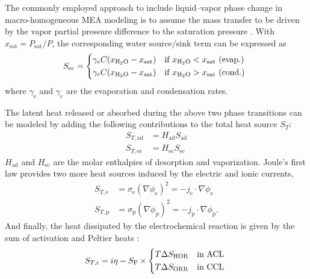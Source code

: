 \documentclass[fontsize=9pt,DIV=calc,a4paper,twocolumn]{scrartcl}
\begin{document}
The commonly employed approach to include liquid--vapor phase change in macro-homogeneous MEA modeling is to assume the mass transfer to be driven by the vapor partial pressure difference to the saturation pressure \cite{fritz:09}. With $x_\mathrm{sat}=P_\mathrm{sat}/P$, the corresponding water source/sink term can be expressed as
%
\begin{equation}
S_\mathrm{ec} =
\begin{dcases*}
\gamma_\mathrm{e}C(x_{\mathrm{H}_2\mathrm{O}}-x_\mathrm{sat}) & if $x_{\mathrm{H}_2\mathrm{O}} < x_\mathrm{sat}$ (evap.)\\
\gamma_\mathrm{c}C(x_{\mathrm{H}_2\mathrm{O}}-x_\mathrm{sat}) & if $x_{\mathrm{H}_2\mathrm{O}} > x_\mathrm{sat}$ (cond.)
\end{dcases*}
\end{equation}
%
where $\gamma_\mathrm{e}$ and $\gamma_\mathrm{c}$ are the evaporation and condensation rates.

The latent heat released or absorbed during the above two phase transitions can be modeled by adding the following contributions to the total heat source $S_T$:
%
\begin{equation}
\begin{aligned}
S_{T,\mathrm{ad}} &= H_\mathrm{ad}S_\mathrm{ad}\\
S_{T,\mathrm{ec}} &= H_\mathrm{ec}S_\mathrm{ec}
\end{aligned}
\end{equation}
%
$H_\mathrm{ad}$ and $H_\mathrm{ec}$ are the molar enthalpies of desorption and vaporization. Joule's first law provides two more heat sources induced by the electric and ionic currents,
%
\begin{equation}
\begin{aligned}
S_{T,\mathrm{e}} &= \sigma_\mathrm{e}(\nabla\phi_\mathrm{e})^2 = -j_\mathrm{e}\cdot\nabla\phi_\mathrm{e}\\
S_{T,\mathrm{p}} &= \sigma_\mathrm{p}(\nabla\phi_\mathrm{p})^2 = -j_\mathrm{p}\cdot\nabla\phi_\mathrm{p}.
\end{aligned}
\end{equation}
%
And finally, the heat dissipated by the electrochemical reaction is given by the sum of activation and Peltier heats \cite{weber:14}:
%
\begin{equation}
S_{T,\mathrm{r}} = i\eta-S_\mathrm{F}\times\begin{dcases*}
T\Delta S_\mathrm{HOR} & in ACL\\
T\Delta S_\mathrm{ORR} & in CCL
\end{dcases*}
\end{equation}
\end{document}
